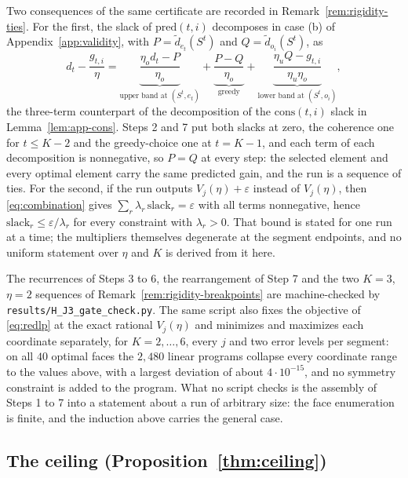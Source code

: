Two consequences of the same certificate are recorded in
Remark~\ref{rem:rigidity-ties}.  For the first, the slack of
$\mathrm{pred}(t,i)$ decomposes in case (b) of Appendix~\ref{app:validity},
with $P=\tilde d_{e_t}(S^{t})$ and $Q=\tilde d_{o_i}(S^{t})$, as
\[
  d_t-\frac{g_{t,i}}{\eta}
  =\underbrace{\frac{\eta_od_t-P}{\eta_o}}_{\text{upper band at }(S^{t},e_t)}
  +\underbrace{\frac{P-Q}{\eta_o}}_{\text{greedy}}
  +\underbrace{\frac{\eta_uQ-g_{t,i}}{\eta_u\eta_o}}_{\text{lower band at
   }(S^{t},o_i)} ,
\]
the three-term counterpart of the decomposition of the $\mathrm{cons}(t,i)$
slack in Lemma~\ref{lem:app-cons}.  Steps 2 and 7 put both slacks at zero,
the coherence one for $t\le K-2$ and the greedy-choice one at $t=K-1$, and
each term of each decomposition is nonnegative, so $P=Q$ at every step: the
selected element and every optimal element carry the same predicted gain, and
the run is a sequence of ties.  For the second, if the run outputs
$V_j(\eta)+\varepsilon$ instead of $V_j(\eta)$, then \eqref{eq:combination}
gives $\sum_r\lambda_r\,\mathrm{slack}_r=\varepsilon$ with all terms
nonnegative, hence $\mathrm{slack}_r\le\varepsilon/\lambda_r$ for every
constraint with $\lambda_r>0$.  That bound is stated for one run at a time;
the multipliers themselves degenerate at the segment endpoints, and no uniform
statement over $\eta$ and $K$ is derived from it here.

The recurrences of Steps 3 to 6, the rearrangement of Step 7 and the two
$K=3$, $\eta=2$ sequences of Remark~\ref{rem:rigidity-breakpoints} are
machine-checked by \texttt{results/H\_J3\_gate\_check.py}.  The same script
also fixes the objective of \eqref{eq:redlp} at the exact rational $V_j(\eta)$
and minimizes and maximizes each coordinate separately, for $K=2,\dots,6$,
every $j$ and two error levels per segment: on all $40$ optimal faces the
$2{,}480$ linear programs collapse every coordinate range to the values above,
with a largest deviation of about $4\cdot10^{-15}$, and no symmetry constraint
is added to the program.  What no script checks is the assembly of Steps 1 to
7 into a statement about a run of arbitrary size: the face enumeration is
finite, and the induction above carries the general case.

\subsection{The ceiling (Proposition~\ref{thm:ceiling})}\label{app:ceiling}

